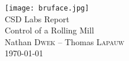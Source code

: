 \begin{titlepage}
\centering

\vspace*{\fill}

\texttt{[image: bruface.jpg]}~\\[0.75cm]
{\Large CSD Labs Report}\\[0.3cm]
{\Large Control of a Rolling Mill}\\[0.7cm]

{\large Nathan \textsc{Dwek} -- Thomas \textsc{Lapauw}}\\[0.2cm]

{\small \today}

\vspace{5cm}
\vspace*{\fill}

\end{titlepage}